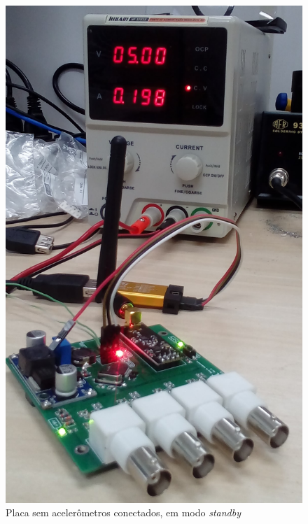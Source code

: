\documentclass[11pt]{abntex2}
\begin{document}
				\begin{figure}[H]
					\centering
					\begin{minipage}{0.4\linewidth}
						\centering
						\includegraphics[width = \linewidth]{../Fotos/consumo0.jpg}
						\caption[Placa sem acelerômetros]{Placa sem acelerômetros conectados, em modo \textit{standby}}
					\end{minipage}
					\hfill\vline\hfill
					\begin{minipage}{0.4\linewidth}
						\centering

\end{minipage}
\end{figure}
\end{document}
